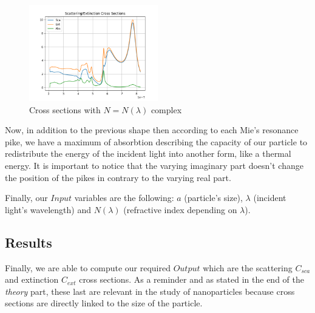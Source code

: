 \documentclass{article}
\numberwithin{equation}{section}
\begin{document}
\begin{figure}[h]
    \centering
    \includegraphics[width=0.5\textwidth, height=0.4\textwidth]{ri_var_complex.png}
    \caption{Cross sections with $N=N(\lambda)$ complex}
\end{figure}
Now, in addition to the previous shape then according to each Mie's resonance pike, we have a maximum of absorbtion describing the capacity of our particle to redistribute the energy of the incident light into another form, like a thermal energy. It is important to notice that the varying imaginary part doesn't change the position of the pikes in contrary to the varying real part.

Finally, our $Input$ variables are the following: $a$ (particle's size), $\lambda$ (incident light's wavelength) and $N(\lambda)$ (refractive index depending on $\lambda$).

\subsection{Results}

Finally, we are able to compute our required $Output$ which are the scattering $C_{sca}$ and extinction $C_{ext}$ cross sections. As a reminder and as stated in the end of the \textit{theory} part, these last are relevant in the study of nanoparticles because cross sections are directly linked to the size of the particle.
\end{document}
